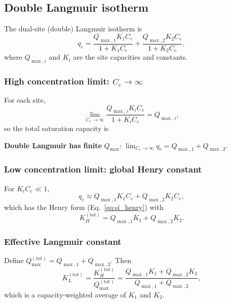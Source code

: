 \documentclass[journal=jacsat,manuscript=article]{achemso}
\begin{document}
\subsection{Double Langmuir isotherm}
\label{sec:si_double_langmuir}

The dual-site (double) Langmuir isotherm is
\begin{equation}
	q_e
	= \frac{Q_{\max,1} K_1 C_e}{1 + K_1 C_e}
	+ \frac{Q_{\max,2} K_2 C_e}{1 + K_2 C_e},
	\label{eq:si_double_langmuir}
\end{equation}
where \(Q_{\max,i}\) and \(K_i\) are the site capacities and constants.

\subsubsection{High concentration limit: \(C_e \to \infty\)}

For each site,
\begin{equation}
	\lim_{C_e \to \infty} \frac{Q_{\max,i} K_i C_e}{1 + K_i C_e}
	= Q_{\max,i},
\end{equation}
so the total saturation capacity is

\textbf{Double Langmuir has finite }$Q_{\max}$:\quad
$\displaystyle \lim_{C_e \to \infty} q_e = Q_{\max,1} + Q_{\max,2}$.

\subsubsection{Low concentration limit: global Henry constant}

For \(K_i C_e \ll 1\),
\begin{equation}
	q_e \approx Q_{\max,1} K_1 C_e + Q_{\max,2} K_2 C_e,
\end{equation}
which has the Henry form (Eq.~\eqref{eq:si_henry}) with
\begin{equation}
	K_H^{\mathrm{(tot)}}
	= Q_{\max,1} K_1 + Q_{\max,2} K_2.
\end{equation}

\subsubsection{Effective Langmuir constant}

Define \(Q_{\max}^{\mathrm{(tot)}} = Q_{\max,1} + Q_{\max,2}\). Then
\begin{equation}
	K_L^{\mathrm{(tot)}}
	= \frac{K_H^{\mathrm{(tot)}}}{Q_{\max}^{\mathrm{(tot)}}}
	= \frac{Q_{\max,1} K_1 + Q_{\max,2} K_2}
	{Q_{\max,1} + Q_{\max,2}},
\end{equation}
which is a capacity-weighted average of \(K_1\) and \(K_2\).
\end{document}
